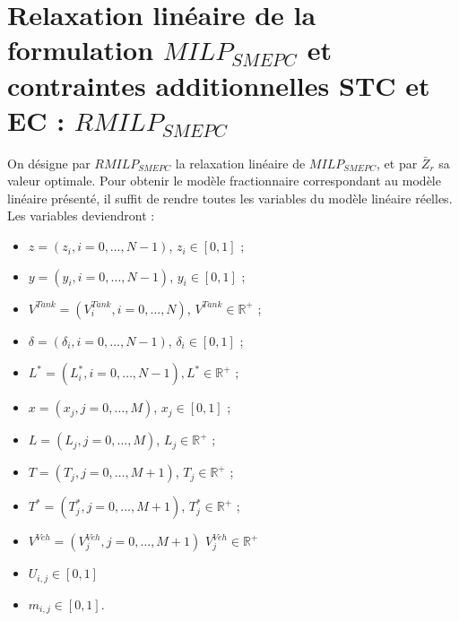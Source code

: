 \section{Relaxation linéaire de la formulation \textit{$MILP_{SMEPC}$} et contraintes additionnelles STC et EC : \textit{$RMILP_{SMEPC}$} }
\label{sec4}
On désigne par \textit{$RMILP_{SMEPC}$} la relaxation linéaire de \textit{$MILP_{SMEPC}$}, et par $\bar{Z}_r$ sa valeur optimale. 
Pour obtenir le modèle fractionnaire correspondant au modèle linéaire présenté, il suffit de rendre toutes les variables du modèle linéaire réelles. Les variables deviendront :


\begin{itemize}[label=$\square$]
	\item $z=(z_i, i=0, \dots, N-1)$, $z_i \in [0,1] $ ;
	
	\item $y=(y_i, i=0, \dots, N-1)$, $y_i \in [0,1] $ ;
	
	\item $V^{Tank} = (V^{Tank}_i, i=0, \dots, N)$,  $V^{Tank} \in \mathbb{R}^{+}$ ;
	
	\item $\delta = (\delta_i, i = 0, \dots, N-1)$, $\delta_i \in [0,1]$ ;
	
	\item $L^*=(L^*_i, i =0, \dots, N-1), L^* \in \mathbb{R}^{+}$ ;
	
	\item $x=(x_j, j = 0, \dots, M)$,  $x_j \in [0,1] $ ;
	
	\item $L = (L_j, j=0, \dots, M)$, $L_j \in \mathbb{R}^{+}$  ;
	
	\item $T= (T_j, j=0, \dots, M+1)$, $T_j \in \mathbb{R}^{+}$ ;
	
	\item $T^*= (T^*_j, j=0, \dots, M+1)$, $T^*_j \in \mathbb{R}^{+}$  ;
	
	\item $V^{Veh} = (V^{Veh}_j, j=0, \dots, M+1)$ $V^{Veh}_j \in \mathbb{R}^{+}$ 
	
	\item $U_{i,j}\in [0,1]$
	
	\item $m_{i,j}\in [0,1]$.	
\end{itemize}



